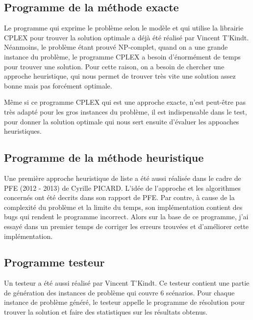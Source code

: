 \subsection{Programme de la méthode exacte}
Le programme qui exprime le problème selon le modèle et qui utilise la librairie CPLEX pour trouver la solution optimale a déjà été réalisé par Vincent T'Kindt. Néanmoins, le problème étant prouvé NP-complet, quand on a une grande instance du problème, le programme CPLEX a besoin d'énormément de temps pour trouver une solution. Pour cette raison, on a besoin de chercher une approche heuristique, qui nous permet de trouver très vite une solution assez bonne mais pas forcément optimale.


Même si ce programme CPLEX qui est une approche exacte, n'est peut-être pas très adapté pour les gros instances du problème, il est indispensable dans le test, pour donner la solution optimale qui nous sert ensuite d'évaluer les appoaches heuristiques.


\subsection{Programme de la méthode heuristique}
Une première approche heuristique de liste a été aussi réalisée dans le cadre de PFE (2012 - 2013) de Cyrille PICARD. L'idée de l'approche et les algorithmes concernés ont été decrits dans son rapport de PFE. Par contre, à cause de la complexité du problème et la limite du temps, son implémentation contient des bugs qui rendent le programme incorrect. Alors sur la base de ce programme, j'ai essayé dans un premier temps de corriger les erreurs trouvées et d'améliorer cette implémentation.


\subsection{Programme testeur}
Un testeur a été aussi réalisé par Vincent T'Kindt. Ce testeur contient une partie de génération des instances de problème qui couvre 6 scénarios. Pour chaque instance de problème généré, le testeur appelle le programme de résolution pour trouver la solution et faire des statistiques sur les résultats obtenus.

